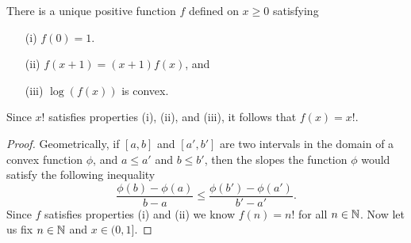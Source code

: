 \begin{theorem}
    There is a unique positive function \( f  \) defined on \( x \geq  0  \) satisfying 
    \begin{enumerate}
        \item[(i)] \( f(0) = 1  \).
        \item[(ii)] \( f(x+1) = (x+1) f(x)  \), and 
        \item[(iii)] \( \log(f(x))  \) is convex.
    \end{enumerate}
    Since \( x!  \) satisfies properties (i), (ii), and (iii), it follows that \( f(x) = x!  \).
\end{theorem}

\begin{proof}
    Geometrically, if \( [a,b]  \) and \( [a',b'] \) are two intervals in the domain of a convex function \( \phi \), and \( a \leq a' \) and \( b \leq b'\), then the slopes the function \( \phi  \) would satisfy the following inequality
    \[  \frac{ \phi(b) - \phi(a)  }{  b - a  } \leq \frac{ \phi(b') - \phi(a')  }{ b' - a' }.  \] Since \( f  \) satisfies properties (i) and (ii) we know \( f(n) = n!  \) for all \( n \in \mathbb{N}  \). Now let us fix \( n \in \mathbb{N}  \) and \( x \in (0,1] \).
\end{proof}


